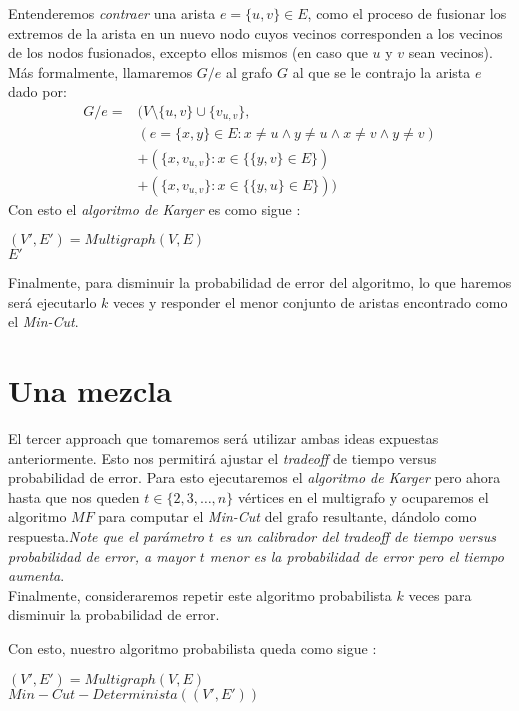 \documentclass[dcc,uchile]{fcfmcourse}
\begin{document}
Entenderemos \textit{contraer} una arista $e = \{u,v\} \in E$, como el proceso de fusionar los extremos de la arista en un nuevo nodo cuyos vecinos corresponden a los vecinos de los nodos fusionados, excepto ellos mismos (en caso que $u$ y $v$ sean vecinos). Más formalmente, llamaremos $G/e$ al grafo $G$ al que se le contrajo la arista $e$ dado por:
\begin{align*}
G/e =& (V\setminus \{u,v\} \cup \{v_{u,v}\} ,\\
&(e = \{x,y\} \in E : x \not = u \land y \not = u \land x \not = v \land y \not = v ) \\ & +(\{x,v_{u,v}\} : x \in \{\{y,v\} \in E\} ) \\ & +(\{x,v_{u,v}\} : x \in \{\{y,u\} \in E\} ))   
\end{align*}
Con esto el \textit{algoritmo de Karger} es como sigue :\\
\begin{algorithm}[H]
        \SetAlgoLined
        $(V',E') = Multigraph(V,E)$\\
        \Return $E'$
\end{algorithm}

Finalmente, para disminuir la probabilidad de error del algoritmo, lo que haremos será ejecutarlo $k$ veces y responder el menor conjunto de aristas encontrado como el \textit{Min-Cut}.
\section{Una mezcla}
El tercer approach que tomaremos será utilizar ambas ideas expuestas anteriormente. Esto nos permitirá ajustar el \textit{tradeoff} de tiempo versus probabilidad de error. Para esto ejecutaremos el \textit{algoritmo de Karger} pero ahora hasta que nos queden $t \in \{2, 3, \ldots, n\}$ vértices en el multigrafo y ocuparemos el algoritmo $MF$ para computar el \textit{Min-Cut} del grafo resultante, dándolo como respuesta.\textit{Note que el parámetro $t$ es un calibrador del \textit{tradeoff} de tiempo versus probabilidad de error, a mayor $t$ menor es la probabilidad de error pero el tiempo aumenta}.\\
Finalmente, consideraremos repetir este algoritmo probabilista $k$ veces para disminuir la probabilidad de error.\newpage

Con esto, nuestro algoritmo probabilista queda como sigue :\\
\begin{algorithm}[H]
        \SetAlgoLined
        $(V',E') = Multigraph(V,E)$\\
        \Return $Min-Cut-Determinista((V',E'))$
\end{algorithm}
\end{document}
